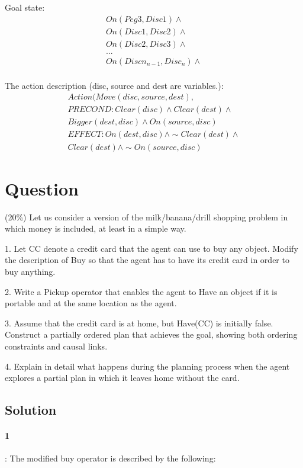 \documentclass[10pt]{article}
\begin{document}
Goal state:
\begin{eqnarray}
On(Peg3, Disc1) \wedge \\
On(Disc1, Disc2) \wedge \\
On(Disc2, Disc3) \wedge \\
...\\
On(Discn_{n-1}, Disc_{n}) \wedge \\
\end{eqnarray}

The action description (disc, source and dest are variables.):
\begin{eqnarray}
Action( Move(disc, source, dest), \\
PRECOND: Clear(disc) \wedge Clear(dest) \wedge  \\
Bigger(dest, disc) \wedge On(source, disc)\\
EFFECT: On(dest, disc) \wedge \sim Clear(dest) \wedge\\
Clear(dest) \wedge \sim On(source, disc)
\end{eqnarray}



\section{Question} 
 (20\%) Let us consider a version of the milk/banana/drill shopping problem in which money is included, at least in a simple way.

1. Let CC denote a credit card that the agent can use to buy any object. Modify the description of Buy so that the agent has to have its credit card in order to buy anything.

2. Write a Pickup operator that enables the agent to Have an object if it is portable and at the same location as the agent.

3. Assume that the credit card is at home, but Have(CC) is initially false. Construct a partially ordered plan that achieves the goal, showing both ordering constraints and causal links.

4. Explain in detail what happens during the planning process when the agent explores a partial plan in which it leaves home without the card. 

\subsection{Solution}

\paragraph{1}: The modified buy operator is described by the following:
\end{document}
